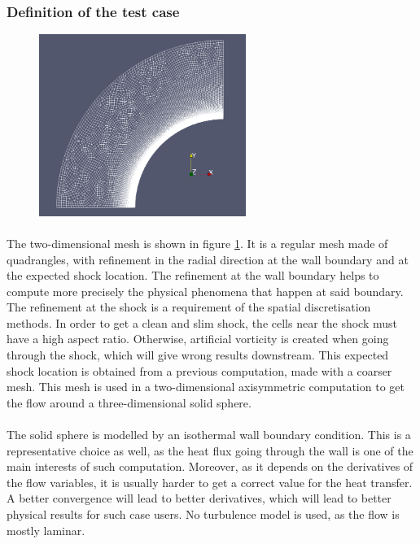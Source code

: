       \subsubsection{Definition of the test case}


        \begin{figure}
          \centering
          \includegraphics[width=0.6\textwidth]{figures/sphere_mesh.png}
          \caption{}
          \label{fig:sphere_mesh}
        \end{figure}

        \paragraph{}
        The two-dimensional mesh is shown in figure \ref{fig:sphere_mesh}.
        It is a regular mesh made of quadrangles, with refinement in the radial direction at the wall boundary and at the expected shock location.
        The refinement at the wall boundary helps to compute more precisely the physical phenomena that happen at said boundary.
        The refinement at the shock is a requirement of the spatial discretisation methods.
        In order to get a clean and slim shock, the cells near the shock must have a high aspect ratio.
        Otherwise, artificial vorticity is created when going through the shock, which will give wrong results downstream. 
        This expected shock location is obtained from a previous computation, made with a coarser mesh.
        This mesh is used in a two-dimensional axisymmetric computation to get the flow around a three-dimensional solid sphere.

        \paragraph{}
        The solid sphere is modelled by an isothermal wall boundary condition.
        This is a representative choice as well, as the heat flux going through the wall is one of the main interests of such computation.
        Moreover, as it depends on the derivatives of the flow variables, it is usually harder to get a correct value for the heat transfer.
        A better convergence will lead to better derivatives, which will lead to better physical results for such case users.
        No turbulence model is used, as the flow is mostly laminar.

